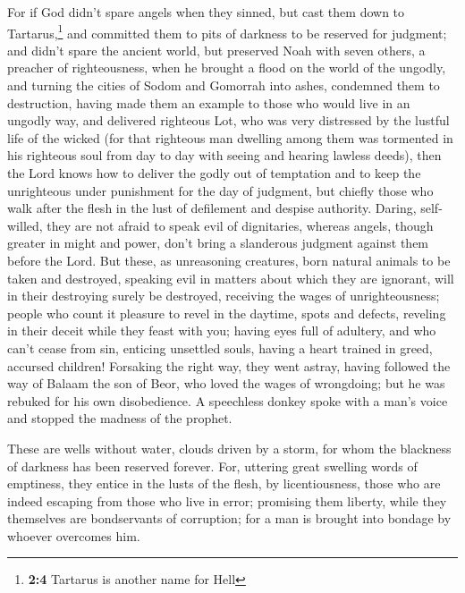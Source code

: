  For if God didn't spare angels when they sinned, but cast
them down to Tartarus,\footnote{\textbf{2:4} Tartarus is another name
  for Hell} and committed them to pits of darkness to be reserved for
judgment;  and didn't spare the ancient world, but
preserved Noah with seven others, a preacher of righteousness, when he
brought a flood on the world of the ungodly,  and turning
the cities of Sodom and Gomorrah into ashes, condemned them to
destruction, having made them an example to those who would live in an
ungodly way,  and delivered righteous Lot, who was very
distressed by the lustful life of the wicked  (for that
righteous man dwelling among them was tormented in his righteous soul
from day to day with seeing and hearing lawless deeds), 
then the Lord knows how to deliver the godly out of temptation and to
keep the unrighteous under punishment for the day of judgment,
 but chiefly those who walk after the flesh in the lust
of defilement and despise authority. Daring, self-willed, they are not
afraid to speak evil of dignitaries,  whereas angels,
though greater in might and power, don't bring a slanderous judgment
against them before the Lord.  But these, as unreasoning
creatures, born natural animals to be taken and destroyed, speaking evil
in matters about which they are ignorant, will in their destroying
surely be destroyed,  receiving the wages of
unrighteousness; people who count it pleasure to revel in the daytime,
spots and defects, reveling in their deceit while they feast with you;
 having eyes full of adultery, and who can't cease from
sin, enticing unsettled souls, having a heart trained in greed, accursed
children!  Forsaking the right way, they went astray,
having followed the way of Balaam the son of Beor, who loved the wages
of wrongdoing;  but he was rebuked for his own
disobedience. A speechless donkey spoke with a man's voice and stopped
the madness of the prophet.

 These are wells without water, clouds driven by a storm,
for whom the blackness of darkness has been reserved forever.
 For, uttering great swelling words of emptiness, they
entice in the lusts of the flesh, by licentiousness, those who are
indeed escaping from those who live in error;  promising
them liberty, while they themselves are bondservants of corruption; for
a man is brought into bondage by whoever overcomes him.

